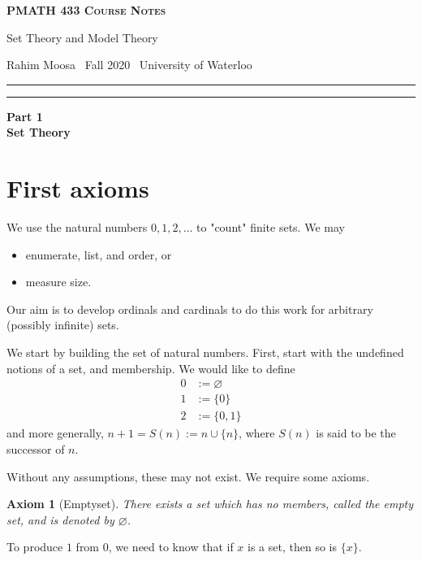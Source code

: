 \documentclass[10pt]{article}
\newcommand{\newtitle}[4]{
  \begin{center}
	\huge{\textbf{\textsc{#1 Course Notes}}}
    
	\large{\sc #2}
    
	{\sc #3 \textbullet\, #4 \textbullet\, University of Waterloo}
	\normalsize\vspace{1cm}\hrule
  \end{center}
}
\theoremstyle{newstyle}
\newtheorem{axiom}[thm]{Axiom}
\begin{document}
\pagestyle{fancy}
\newtitle{PMATH 433}{Set Theory and Model Theory}{Rahim Moosa}{Fall 2020}

\tableofcontents
\vspace{1cm}\hrule

\newpage 
{}
\thispagestyle{empty}
\hspace{0pt}\vfill
\begin{center} 
\LARGE{{\bf Part 1}} \\\vspace{0.5cm}
\LARGE{\bf Set Theory}
\end{center}
\vfill\hspace{0pt}
\newpage 

\section{First axioms}

We use the natural numbers $0, 1, 2, \dots$ to "count" finite sets. We may 
\begin{itemize}
    \item enumerate, list, and order, or
    \item measure size.
\end{itemize}
Our aim is to develop ordinals and cardinals to do this work for arbitrary (possibly infinite) sets. 

We start by building the set of natural numbers. First, start with the undefined notions of a set, and 
membership. We would like to define 
\begin{align*} 
0 &:= \varnothing \\ 
1 &:= \{0\} \\ 
2 &:= \{0, 1\}
\end{align*}
and more generally, $n+1 = S(n) := n \cup \{n\}$, where $S(n)$ is said to be the successor of $n$. 

Without any assumptions, these may not exist. We require some axioms. 

\begin{axiom}[Emptyset] 
There exists a set which has no members, called the empty set, and is denoted by $\varnothing$. 
\end{axiom}

To produce $1$ from $0$, we need to know that if $x$ is a set, then so is $\{x\}$. 
\end{document}
